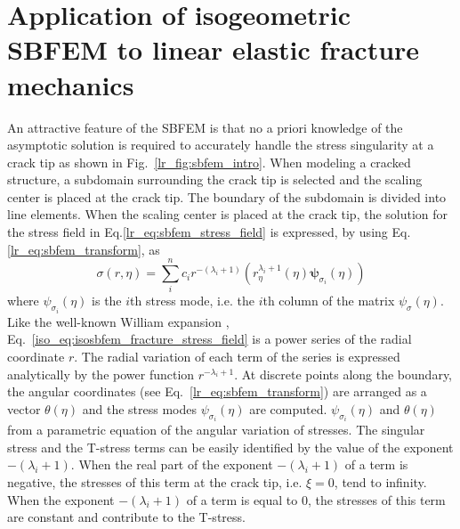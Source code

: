 \section{Application of isogeometric SBFEM to linear elastic fracture mechanics}
\label{iso_section:fracture}
An attractive feature of the SBFEM is that no a priori knowledge of the asymptotic solution is required to accurately handle the stress singularity at a crack tip as shown in Fig.~\ref{lr_fig:sbfem_intro}.
When modeling a cracked structure, a subdomain surrounding the crack tip is selected and the scaling center is placed at the crack tip.
The boundary of the subdomain is divided into line elements.
When the scaling center is placed at the crack tip, the solution for the stress field in Eq.\ref{lr_eq:sbfem_stress_field} is expressed, by using Eq.\ref{lr_eq:sbfem_transform}, as
    \begin{equation}
        \sigma(r,\eta) = \sum_i^n
            c_i r^{-(\lambda_i+1)} \left(
                r_\eta^{\lambda_i+1} (\eta)
                \boldsymbol{\psi}_{\sigma_i}(\eta)
            \right)
        \label{iso_eq:isosbfem_fracture_stress_field}
    \end{equation}
where $\psi_{\sigma_i}(\eta)$ is the $i$th stress mode, i.e. the $i$th column of the matrix $\psi_\sigma(\eta)$.
Like the well-known William expansion \cite{Williams1957109}, Eq.~\ref{iso_eq:isosbfem_fracture_stress_field} is a power series of the radial coordinate $r$.
The radial variation of each term of the series is expressed analytically by the power function $r^{-\lambda_i + 1}$.
At discrete points along the boundary, the angular coordinates (see Eq.~\ref{lr_eq:sbfem_transform}) are arranged as a vector $\theta(\eta)$ and the stress modes $\psi_{\sigma_i}(\eta)$ are computed.
$\psi_{\sigma_i}(\eta)$ and $\theta(\eta)$ from a parametric equation of the angular variation of stresses.
The singular stress and the T-stress terms can be easily identified by the value of the exponent $-(\lambda_i+1)$.
When the real part of the exponent $-(\lambda_i+1)$ of a term is negative, the stresses of this term at the crack tip, i.e. $\xi=0$, tend to infinity.
When the exponent $-(\lambda_i+1)$ of a term is equal to 0, the stresses of this term are constant and contribute to the T-stress.
